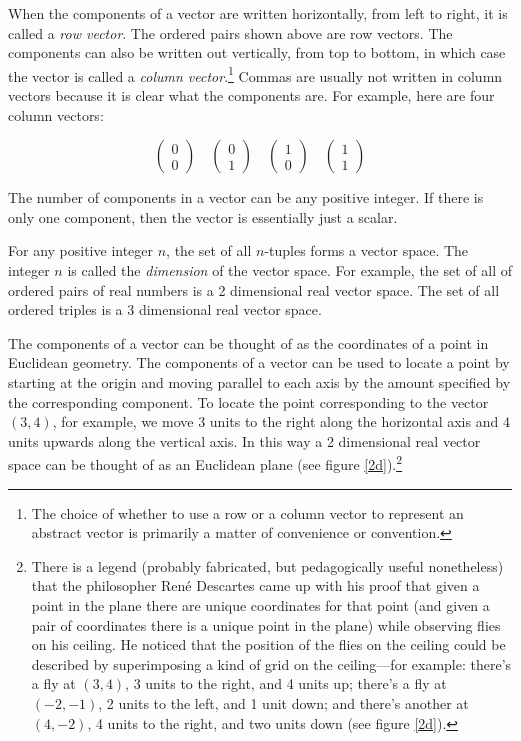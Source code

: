 When the components of a vector are written horizontally, from left to right,
it is called a {\em row vector}. The ordered pairs shown above are row 
vectors. The components can also be written out vertically, from top to 
bottom, in which case the vector is called a {\em column vector}.\footnote{The choice of whether
to use a row or a column vector to represent an abstract vector is primarily a matter of 
convenience or convention.} Commas are usually 
not written in column vectors because it is clear what the components are. For 
example, here are four column vectors:
\begin{small}
\begin{equation*}
\begin{pmatrix}
0 \\
0
\end{pmatrix} 
\quad 
\begin{pmatrix}
0 \\
1
\end{pmatrix} 
\quad 
\begin{pmatrix}
1 \\
0
\end{pmatrix} 
\quad 
\begin{pmatrix}
1 \\
1
\end{pmatrix} 
\end{equation*}
\end{small}
The number of components in a vector can be any positive integer. If there is
only one component, then the vector is essentially just a scalar.

   For any positive integer $n$, the set of all $n$-tuples forms a vector space.
The integer $n$ is called the {\em dimension} of the vector space. For 
example, the set of all of ordered pairs of real numbers is a 2 dimensional 
real vector space. The set of all ordered triples is a 3 dimensional real 
vector space. 

   The components of a vector can be thought of as the coordinates of a point
in Euclidean geometry. The components of a vector can be used to locate a
point by starting at the origin and moving parallel to each axis by the 
amount specified by the corresponding component. To locate the point corresponding to the vector 
$(3,4)$, for example, we move $3$ units to the right along the 
horizontal axis and $4$ units upwards along the vertical axis. In this way a 
2 dimensional real vector space can be thought of as an Euclidean plane (see 
figure \ref{2d}).\footnote{There is a legend (probably fabricated, but pedagogically useful nonetheless) 
that the philosopher Ren{\'{e}} Descartes 
 came up with his proof that given a point in the plane there are unique coordinates for that 
 point (and given a pair of coordinates there is a unique point in the plane) 
 while observing flies on his ceiling. He 
 noticed that the position of the flies on the ceiling could be described by 
 superimposing a kind of grid on the ceiling---for example: there's a fly at 
 $(3,4)$, 3 units to the right, and 4 units up; there's a fly at 
 $(-2,-1)$, 2 units to the left, and 1 unit down; and there's another at 
 $(4,-2)$, 4 units to the right, and two units down (see figure \ref{2d}).} 
 
